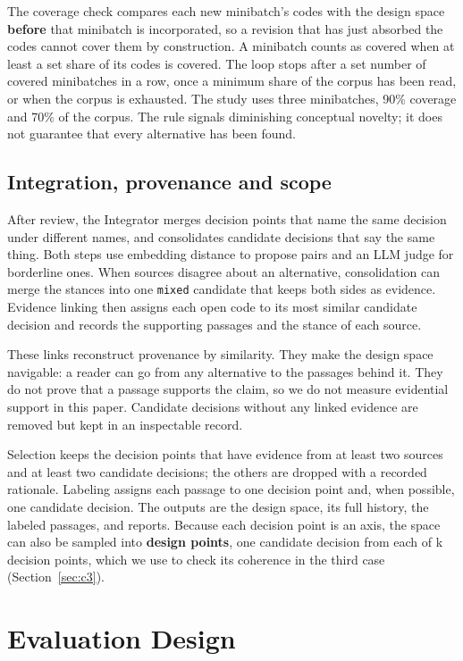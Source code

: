 \documentclass[conference]{IEEEtran}
\begin{document}
The coverage check compares each new minibatch's codes with the design space \textbf{before} that minibatch is incorporated, so a revision that has just absorbed the codes cannot cover them by construction. A minibatch counts as covered when at least a set share of its codes is covered. The loop stops after a set number of covered minibatches in a row, once a minimum share of the corpus has been read, or when the corpus is exhausted. The study uses three minibatches, 90\% coverage and 70\% of the corpus. The rule signals diminishing conceptual novelty; it does not guarantee that every alternative has been found.

\subsection{Integration, provenance and scope}

After review, the Integrator merges decision points that name the same decision under different names, and consolidates candidate decisions that say the same thing. Both steps use embedding distance to propose pairs and an LLM judge for borderline ones. When sources disagree about an alternative, consolidation can merge the stances into one \texttt{mixed} candidate that keeps both sides as evidence. Evidence linking then assigns each open code to its most similar candidate decision and records the supporting passages and the stance of each source.

These links reconstruct provenance by similarity. They make the design space navigable: a reader can go from any alternative to the passages behind it. They do not prove that a passage supports the claim, so we do not measure evidential support in this paper. Candidate decisions without any linked evidence are removed but kept in an inspectable record.

Selection keeps the decision points that have evidence from at least two sources and at least two candidate decisions; the others are dropped with a recorded rationale. Labeling assigns each passage to one decision point and, when possible, one candidate decision. The outputs are the design space, its full history, the labeled passages, and reports. Because each decision point is an axis, the space can also be sampled into \textbf{design points}, one candidate decision from each of k decision points, which we use to check its coherence in the third case (Section~\ref{sec:c3}).

\section{Evaluation Design}
\end{document}
